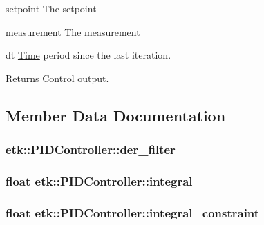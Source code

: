 \begin{DoxyItemize}
\item setpoint The setpoint \item measurement The measurement \item dt \hyperlink{classetk_1_1_time}{Time} period since the last iteration. \begin{DoxyReturn}{Returns}
Control output. 
\end{DoxyReturn}
\end{DoxyItemize}


\subsection{Member Data Documentation}
\hypertarget{classetk_1_1_p_i_d_controller_a73e3b7bc002861712facbb017bfe6e6d}{
\subsubsection[{der\-\_\-filter}]{ etk\-::\-P\-I\-D\-Controller\-::der\-\_\-filter\hspace{0.3cm}{\ttfamily [protected]}}}\label{classetk_1_1_p_i_d_controller_a73e3b7bc002861712facbb017bfe6e6d}
\hypertarget{classetk_1_1_p_i_d_controller_a3aed53bb90e1600d440e236ab0d6f4b9}{
\subsubsection[{integral}]{\setlength{\rightskip}{0pt plus 5cm}float etk\-::\-P\-I\-D\-Controller\-::integral\hspace{0.3cm}{\ttfamily [protected]}}}\label{classetk_1_1_p_i_d_controller_a3aed53bb90e1600d440e236ab0d6f4b9}
\hypertarget{classetk_1_1_p_i_d_controller_a33d2b8813eea388174ca01d4fd7ec148}{
\subsubsection[{integral\-\_\-constraint}]{\setlength{\rightskip}{0pt plus 5cm}float etk\-::\-P\-I\-D\-Controller\-::integral\-\_\-constraint\hspace{0.3cm}{\ttfamily [protected]}}}\label{classetk_1_1_p_i_d_controller_a33d2b8813eea388174ca01d4fd7ec148}
